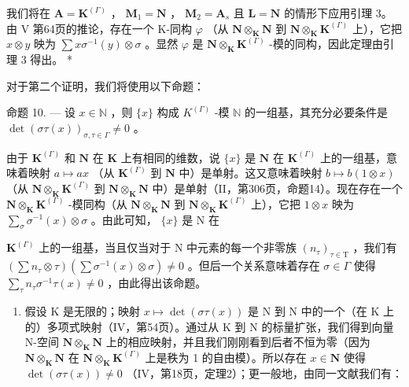 我们将在 \(\mathbf{A} = \mathbf{K}^{(\Gamma)}\) ， \(\mathbf{M}_1 = \mathbf{N}\) ， \(\mathbf{M}_2 = \mathbf{A}_s\) 且 \(\mathbf{L} = \mathbf{N}\) 的情形下应用引理 3。由 V 第64页的推论，存在一个 K-同构 \(\varphi\) （从 \(\mathbf{N} \otimes_{\mathbf{K}} \mathbf{N}\) 到 \(\mathbf{N} \otimes_{\mathbf{K}} \mathbf{K}^{(\Gamma)}\) 上），它把 \(x \otimes y\) 映为 \(\sum x \sigma^{-1}(y) \otimes \sigma\) 。显然 \(\varphi\) 是 \(\mathbf{N} \otimes_{\mathbf{K}} \mathbf{K}^{(\Gamma)}\) -模的同构，因此定理由引理 3 得出。 *

对于第二个证明，我们将使用以下命题：

命题 10. --- 设 \(x \in \mathbb{N}\) ，则 \(\{x\}\) 构成 \(K^{(\Gamma)}\) -模 \(\mathbb{N}\) 的一组基，其充分必要条件是 \(\det(\sigma\tau(x))_{\sigma,\tau \in \Gamma} \neq 0\) 。

由于 \(\mathbf{K}^{(\Gamma)}\) 和 \(\mathbf{N}\) 在 \(\mathbf{K}\) 上有相同的维数，说 \(\{x\}\) 是 \(\mathbf{N}\) 在 \(\mathbf{K}^{(\Gamma)}\) 上的一组基，意味着映射 \(a \mapsto ax\) （从 \(\mathbf{K}^{(\Gamma)}\) 到 \(\mathbf{N}\) 中）是单射。这又意味着映射 \(b \mapsto b(1 \otimes x)\) （从 \(\mathbf{N} \otimes_{\mathbf{K}} \mathbf{K}^{(\Gamma)}\) 到 \(\mathbf{N} \otimes_{\mathbf{K}} \mathbf{N}\) 中）是单射（II，第306页，命题14）。现在存在一个 \(\mathbf{N} \otimes_{\mathbf{K}} \mathbf{K}^{(\Gamma)}\) -模同构（从 \(\mathbf{N} \otimes_{\mathbf{K}} \mathbf{N}\) 到 \(\mathbf{N} \otimes_{\mathbf{K}} \mathbf{K}^{(\Gamma)}\) 上），它把 \(1 \otimes x\) 映为 \(\sum_{\sigma} \sigma^{-1}(x) \otimes \sigma\) 。由此可知， \(\{x\}\) 是 N 在

\(\mathbf{K}^{(\Gamma)}\) 上的一组基，当且仅当对于 N 中元素的每一个非零族 \((n_{\tau})_{\tau\in\mathrm{T}}\) ，我们有 \(\left(\sum n_{\tau}\otimes\tau\right)\left(\sum\sigma^{-1}(x)\otimes\sigma\right)\neq0\) 。但后一个关系意味着存在 \(\sigma\in\Gamma\) 使得 \(\sum_{\tau}n_{\tau}\sigma^{-1}\tau(x)\neq0\) ，由此得出该命题。

\begin{enumerate}
\def\labelenumi{\Alph{enumi})}
\tightlist
\item
  假设 K 是无限的；映射 \(x \mapsto \det(\sigma\tau(x))\) 是 N 到 N 中的一个（在 K 上的）多项式映射（IV，第54页）。通过从 K 到 N 的标量扩张，我们得到向量 N-空间 \(\mathbf{N} \otimes_{\mathbf{K}} \mathbf{N}\) 上的相应映射，并且我们刚刚看到后者不恒为零（因为 \(\mathbf{N} \otimes_{\mathbf{K}} \mathbf{N}\) 在 \(\mathbf{N} \otimes_{\mathbf{K}} \mathbf{K}^{(\Gamma)}\) 上是秩为 1 的自由模）。所以存在 \(x \in \mathbf{N}\) 使得 \(\det(\sigma\tau(x)) \neq 0\) （IV，第18页，定理2）；更一般地，由同一文献我们有：
\end{enumerate}

